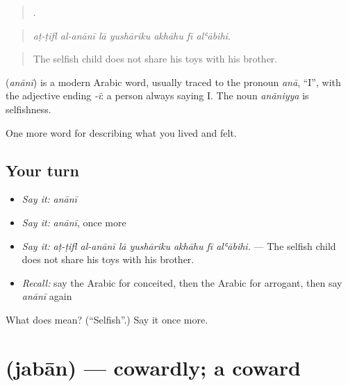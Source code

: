 \begin{quote}
      .
\end{quote}

\begin{quote}
\emph{aṭ-ṭifl al-anānī lā yushāriku akhāhu fī alʿābihi.}
\end{quote}

\begin{quote}
The selfish child does not share his toys with his brother.
\end{quote}

\begin{cousinweb}
\textbf{} (\emph{anānī}) is a modern Arabic word, usually traced to the pronoun \emph{anā}, \textquotedblleft{}I\textquotedblright{}, with the adjective ending \emph{-ī}: a person always saying I. The noun \emph{anāniyya} is selfishness.
\end{cousinweb}

\begin{grammarlens}[title={What you've built}]
One more word for describing what you lived and felt.
\end{grammarlens}

\subsection*{Your turn}
\begin{itemize}
\raggedright
  \item \emph{Say it:} \emph{anānī}
  \item \emph{Say it:} \emph{anānī}, once more
  \item \emph{Say it:} \emph{aṭ-ṭifl al-anānī lā yushāriku akhāhu fī alʿābihi.} — The selfish child does not share his toys with his brother.
  \item \emph{Recall:} say the Arabic for conceited, then the Arabic for arrogant, then say \emph{anānī} again
\end{itemize}

\begin{tcolorbox}[breakable,colback=teal!4,colframe=teal!35!black,title={Before you move on}]
What does  mean? (\textquotedblleft{}Selfish\textquotedblright{}.) Say it once more.
\end{tcolorbox}
\section[\texorpdfstring{\ar{جبان} (jabān)}{جبان (jabān)}]{ (jabān) — cowardly; a coward}

